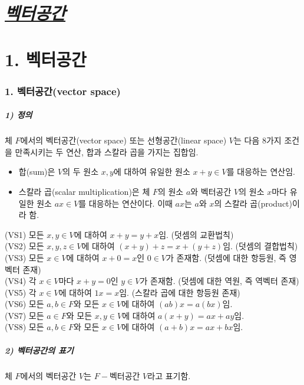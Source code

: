 \part{\textit{\underline{벡터공간}}}
\part*{1. 벡터공간}

\section*{1. 벡터공간(vector space)}

\subsubsection*{1) 정의\\}
\begin{DEF}
체 $F$에서의 벡터공간(vector space) 또는 선형공간(linear space) $V$는 다음 8가지 조건을 만족시키는 두 연산, 합과 스칼라 곱을 가지는 집합임.

\begin{itemize}
\item 합(sum)은 $V$의 두 원소 $x, y$에 대하여 유일한 원소 $x+y \in V$를 대응하는 연산임.
\item 스칼라 곱(scalar multiplication)은 체 $F$의 원소 $a$와 벡터공간 $V$의 원소 $x$마다 유일한 원소 $ax \in V$를 대응하는 연산이다. 이때 $ax$는 $a$와 $x$의 스칼라 곱(product)이라 함.
\end{itemize}

(VS1) 모든 $x,y \in V$에 대하여 $x+y=y+x$임. (덧셈의 교환법칙)\\
(VS2) 모든 $x,y,z \in V$에 대하여 $(x+y)+z=x+(y+z)$임. (덧셈의 결합법칙)\\
(VS3) 모든 $x \in V$에 대하여 $x+0=x$인 $0 \in V$가 존재함. (덧셈에 대한 항등원, 즉 영벡터 존재)\\
(VS4) 각 $x \in V$마다 $x+y=0$인 $y \in V$가 존재함. (덧셈에 대한 역원, 즉 역벡터 존재)\\
(VS5) 각 $x \in V$에 대하여 $1x=x$임. (스칼라 곱에 대한 항등원 존재)\\
(VS6) 모든 $a,b \in F$와 모든 $x \in V$에 대하여 $(ab)x=a(bx)$임.\\
(VS7) 모든 $a \in F$와 모든 $x,y \in V$에 대하여 $a(x+y)=ax+ay$임.\\
(VS8) 모든 $a,b \in F$와 모든 $x \in V$에 대하여 $(a+b)x=ax+bx$임.
\end{DEF}

\subsubsection*{2) 벡터공간의 표기}
체 $F$에서의 벡터공간 $V$는 $F-$벡터공간 $V$라고 표기함.

